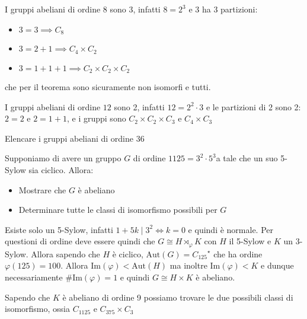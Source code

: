 \begin{example}
    I gruppi abeliani di ordine \(8\) sono \(3\), infatti \(8 = 2^{3}\) e \(3\)
    ha 3 partizioni:
\begin{itemize}[label = --]
    \item \(3 = 3 \implies C_8\)
    \item \(3 = 2+1 \implies C_4 \times C_2 \)
    \item \(3 = 1 + 1 + 1 \implies C_{2} \times C_{2} \times C_{2}\) 
\end{itemize}
che per il teorema sono sicuramente non isomorfi e tutti.
\end{example}
\begin{example}
    I gruppi abeliani di ordine \(12\) sono 2, infatti \(12 = 2^{2}\cdot 3\) e
    le partizioni di 2 sono 2: \(2 = 2\) e \(2 = 1 + 1\), e i gruppi sono
    \(C_{2}\times C_{2}\times C_{3}\) e \(C_{4} \times C_{3}\) 
\end{example}
\begin{eser}
    Elencare i gruppi abeliani di ordine 36
\end{eser}

\begin{eser}
    Supponiamo di avere un gruppo \(G\) di ordine \(1125 = 3^2 \cdot
    5^3\)a tale che un suo 5-Sylow sia ciclico. Allora:
\begin{itemize}[label = --]
    \item Mostrare che \(G\) è abeliano
    \item Determinare tutte le classi di isomorfismo possibili per \(G\)  
\end{itemize}
\tcblower
Esiste solo un 5-Sylow, infatti \(1+5k \mid 3^2 \iff k = 0\) e quindi è normale.
Per questioni di ordine deve essere quindi che \(G \cong H \rtimes_\varphi  K\) con
\(H\) il 5-Sylow e \(K\) un 3-Sylow.
Allora sapendo che \(H\) è ciclico, \(\mathrm{Aut}{(G)} = {C_{125}}^{\star}\)
che ha ordine \(\varphi{(125)} = 100\). Allora \(\mathrm{Im}{(\varphi)} <
\mathrm{Aut}{(H)}\) ma inoltre \(\mathrm{Im}{(\varphi )}< K\) e dunque
necessariamente \(\# \mathrm{Im}{(\varphi )} = 1\) e quindi \(G \cong H \times
K\) è abeliano.

Sapendo che \(K\) è abeliano di ordine 9 possiamo trovare le due possibili
classi di isomorfismo, ossia \(C_{1125} \) e \(C_{375} \times C_{3}\)
\end{eser}










